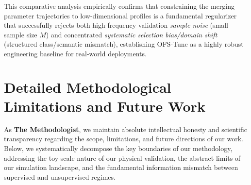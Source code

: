 \documentclass{article}
\theoremstyle{plain}
\theoremstyle{definition}
\theoremstyle{remark}
\begin{document}
This comparative analysis empirically confirms that constraining the merging parameter trajectories to low-dimensional profiles is a fundamental regularizer that successfully rejects both high-frequency validation \emph{sample noise} (small sample size $M$) and concentrated \emph{systematic selection bias/domain shift} (structured class/semantic mismatch), establishing OFS-Tune as a highly robust engineering baseline for real-world deployments.


\newpage
\section{Detailed Methodological Limitations and Future Work}
\label{appendix:limitations}

As \textbf{The Methodologist}, we maintain absolute intellectual honesty and scientific transparency regarding the scope, limitations, and future directions of our work. Below, we systematically decompose the key boundaries of our methodology, addressing the toy-scale nature of our physical validation, the abstract limits of our simulation landscape, and the fundamental information mismatch between supervised and unsupervised regimes.
\end{document}
